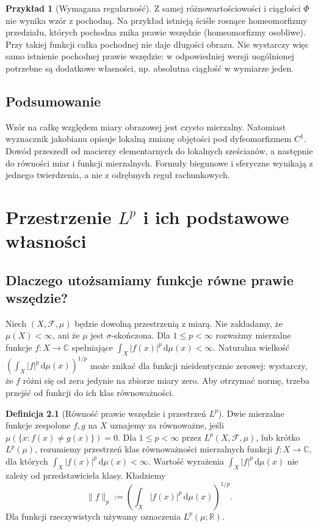 \documentclass[11pt,a4paper,oneside]{book}
\numberwithin{equation}{chapter}
\theoremstyle{plain}
\theoremstyle{definition}
\newtheorem{definicja}[twierdzenie]{Definicja}
\newtheorem{przyklad}[twierdzenie]{Przykład}
\theoremstyle{remark}
\begin{document}
\begin{przyklad}[Wymagana regularność]
Z samej różnowartościowości i ciągłości $\Phi$ nie wynika
wzór z pochodną. Na przykład istnieją ściśle rosnące
homeomorfizmy przedziału, których pochodna znika
prawie wszędzie (homeomorfizmy osobliwe).
Przy takiej funkcji całka pochodnej nie daje długości obrazu.
Nie wystarczy więc samo istnienie pochodnej prawie wszędzie:
w odpowiedniej wersji uogólnionej potrzebne są dodatkowe
własności, np. absolutna ciągłość w wymiarze jeden.
\end{przyklad}

\section{Podsumowanie}
Wzór na całkę względem miary obrazowej jest czysto
mierzalny. Natomiast wyznacznik jakobianu opisuje
lokalną zmianę objętości pod dyfeomorfizmem $C^1$.
Dowód przeszedł od macierzy elementarnych do lokalnych
sześcianów, a następnie do równości miar i funkcji
mierzalnych. Formuły biegunowe i sferyczne wynikają
z jednego twierdzenia, a nie z odrębnych reguł rachunkowych.



\chapter{Przestrzenie $L^p$ i ich podstawowe własności}
\label{ch:przestrzenie-lp}

\section{Dlaczego utożsamiamy funkcje równe prawie wszędzie?}
Niech $(X,\mathcal F,\mu)$ będzie dowolną przestrzenią z miarą.
Nie zakładamy, że $\mu(X)<\infty$, ani że $\mu$ jest $\sigma$-skończona.
Dla $1\le p<\infty$ rozważmy mierzalne funkcje
$f:X\to\mathbb C$ spełniające
$\int_X|f(x)|^p\,\mathrm d\mu(x)<\infty$.
Naturalna wielkość
$(\int_X|f|^p\,\mathrm d\mu(x))^{1/p}$
może znikać dla funkcji nieidentycznie zerowej:
wystarczy, że $f$ różni się od zera jedynie na zbiorze
miary zero. Aby otrzymać normę, trzeba przejść
od funkcji do ich klas równoważności.

\begin{definicja}[Równość prawie wszędzie i przestrzeń $L^p$]
\label{def:lp-14}
Dwie mierzalne funkcje zespolone $f,g$ na $X$
uznajemy za równoważne, jeśli $\mu(\{x:f(x)\ne g(x)\})=0$.
Dla $1\le p<\infty$ przez $L^p(X,\mathcal F,\mu)$, lub
krótko $L^p(\mu)$, rozumiemy przestrzeń klas
równoważności mierzalnych funkcji $f:X\to\mathbb C$,
dla których $\int_X|f(x)|^p\,\mathrm d\mu(x)<\infty$.
Wartość wyrażenia $\int_X|f|^p\,\mathrm d\mu(x)$
nie zależy od przedstawiciela klasy. Kładziemy
\begin{equation}\label{eq:p-norm-14}
\|f\|_p:=\left(\int_X|f(x)|^p\,\mathrm d\mu(x)\right)^{1/p}.
\end{equation}
Dla funkcji rzeczywistych używamy oznaczenia $L^p(\mu;\mathbb R)$.
\end{definicja}
\end{document}
